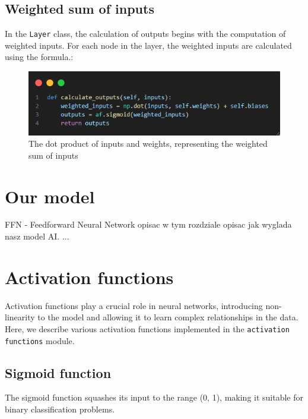 \documentclass{article}
\begin{document}
\subsection{Weighted sum of inputs}
In the \texttt{Layer} class, the calculation of outputs begins with the computation of weighted inputs. For each node in the layer, the weighted inputs are calculated using the formula.:
\begin{figure}[ht]
    \centering
    \includegraphics[width=1\textwidth]{images/dot-product-of-inputs-and-weights.png}
    \caption{The dot product of inputs and weights, representing the weighted sum of inputs}
    \label{fig:weighted_sum}
\end{figure}

\newpage
\section{Our model}
FFN - Feedforward Neural Network
opisac w tym rozdziale opisac jak wyglada nasz model AI.
...

\newpage
\section{Activation functions}
Activation functions play a crucial role in neural networks, introducing non-linearity to the model and allowing it to learn complex relationships in the data. Here, we describe various activation functions implemented in the \texttt{activation functions} module.

\subsection{Sigmoid function}
The sigmoid function squashes its input to the range (0, 1), making it suitable for binary classification problems.
\end{document}
